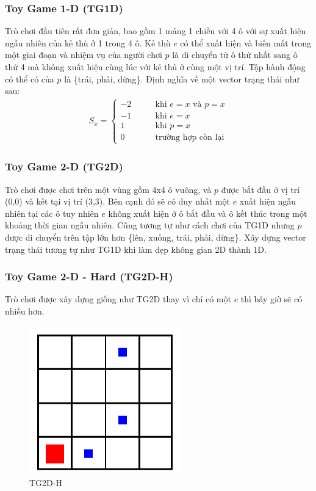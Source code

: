 \documentclass[12pt,a4paper]{article}
\begin{document}
\subsubsection{Toy Game 1-D (TG1D)}
Trò chơi đầu tiên rất đơn giản, bao gồm 1 mảng 1 chiều  với 4 ô với sự xuất hiện ngẫu nhiên của kẻ thù ở 1 trong 4 ô. Kẻ thù $e$ có thể xuất hiện và biến mất trong một giai đoạn và nhiệm vụ của người chơi $p$ là di chuyển từ ô thứ nhất sang ô thứ 4 mà không xuất hiện cùng lúc với kẻ thủ ở cùng một vị trí. Tập hành động có thể có của $p$ là \{trái, phải, dừng\}. Định nghĩa về một vector trạng thái như sau:\\
\begin{align*}
S_x=\begin{cases}
-2\quad \quad &\text{khi $e=x$ và $p=x$}\\
-1\quad \quad &\text{khi $e=x$}\\
1 \quad \quad &\text{khi $p=x$}\\
0 \quad \quad &\text{trường hợp còn lại}
\end{cases}
\end{align*}
\subsubsection{Toy Game 2-D (TG2D)}
Trò chơi được chơi trên một vùng gồm 4x4 ô vuông, và $p$ được bắt đầu ở vị trí (0,0) và kết tại vị trí (3,3). Bên cạnh đó sẽ có duy nhất một $e$ xuất hiện ngẫu nhiên tại các ô tuy nhiên $e$ không xuất hiện ở ô bắt đầu và ô kết thúc trong một khoảng thời gian ngẫu nhiên. Cũng tương tự như cách chơi của TG1D nhưng $p$ được di chuyển trên tập lớn hơn \{lên, xuống, trái, phải, dừng\}. Xây dựng vector trạng thái tương tự như TG1D khi làm dẹp không gian 2D thành 1D.
\subsubsection{Toy Game 2-D - Hard (TG2D-H)}
Trò chơi được xây dựng giống như TG2D thay vì chỉ có một $e$ thì bây giờ sẽ có nhiều hơn.
\begin{figure}[t]
    \centering
    \includegraphics{photo/TG2D_H.png}
    \caption{TG2D-H}
    \label{fig:my_label}
\end{figure}
\end{document}
